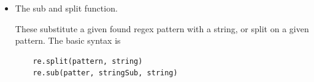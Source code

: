 \begin{itemize}
Note, you can do a lot niftier things with groups in python's \textit{RE} module, such as attributing keys. For example,

\begin{verbatim}
s = re.search(r"(?P\<number\>\d{3}-\d{3}-\d{4}).+(?P\<time\>\d{1}-\d{1})(?P\<ampm\>am|pm)", "My number is 212-333-3333, and you can call 5-6pm")
if s:
    print "this is the number:", s.group("number")
    print "this is the time:", s.group("time")
    print "this is the meridiem:", s.group("ampm")
\end{verbatim}




    \begin{digression*}
        The only difference between re.match() and re.search() is the fact that match looks for patterns at the beginning of a string and search anywhere within. You can turn a search into a match function by appending a \^{} to the beginning of the patter at hand. 

    \end{digression*}


    \item The sub and split function. 

    
        These substitute a given found regex pattern with a string, or split on a given pattern. The basic syntax is

\begin{verbatim}
    re.split(pattern, string)
    re.sub(patter, stringSub, string)
\end{verbatim}


\end{itemize}


\vspace{.5 in}

\newpage


